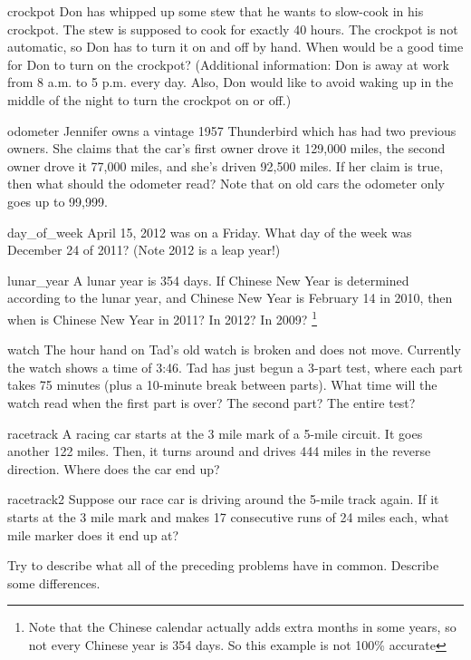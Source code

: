 \begin{example}{crockpot}
Don has whipped up some stew that he wants to slow-cook in his crockpot. The stew is supposed to cook for exactly 40 hours. The crockpot is not automatic, so Don has to turn it on and off by hand. When would be a good time for Don to turn on the crockpot? (Additional information: Don is away at work from 8 a.m. to 5 p.m. every day. Also, Don would like to avoid waking up in the middle of the night to turn the crockpot on or off.)
\end{example}
\begin{example}{odometer}
Jennifer owns a vintage 1957 Thunderbird which has had two previous owners. She claims that the car's first owner drove it 129,000 miles, the second owner drove  it 77,000 miles, and she's driven 92,500 miles. If her claim is true, then what should the odometer read? Note that on old cars the odometer only goes up to 99,999.
\end{example}
\begin{example}{day_of_week}
April 15, 2012 was on a Friday. What day of the week was December 24 of 2011? (Note 2012 is a leap year!)   
\end{example}
\begin{example}{lunar_year}
A lunar year is 354 days. If Chinese New Year is determined according to the lunar year, and Chinese New Year is February 14 in 2010, then when is Chinese New Year in 2011? In 2012? In 2009? 
\footnote{Note that the Chinese calendar actually adds extra months in some years, so not every Chinese year is 354 days. So this example is not 100\% accurate}
\end{example}
\begin{example}{watch}
The hour hand on Tad's old watch is broken and does not move. Currently the watch shows a time of 3:46.  Tad has just begun a 3-part test, where each part takes 75 minutes (plus a 10-minute break between parts). What time will the watch read when the first part is over? The second part? The entire test? 
\end{example}
\begin{example}{racetrack}
A racing car starts at the 3 mile mark of a 5-mile circuit.  It goes another 122 miles.  Then, it turns around and drives 444 miles in the reverse direction. Where does the car end up? 
\end{example}
\begin{example}{racetrack2}
Suppose our race car is driving around the 5-mile track again.  If it starts at the 3 mile mark and makes 17 consecutive runs of 24 miles each, what mile marker does it end up at? 
\end{example}
\begin{exercise}{}
Try to describe what all of the preceding problems have in common. Describe some differences.
\end{exercise}

